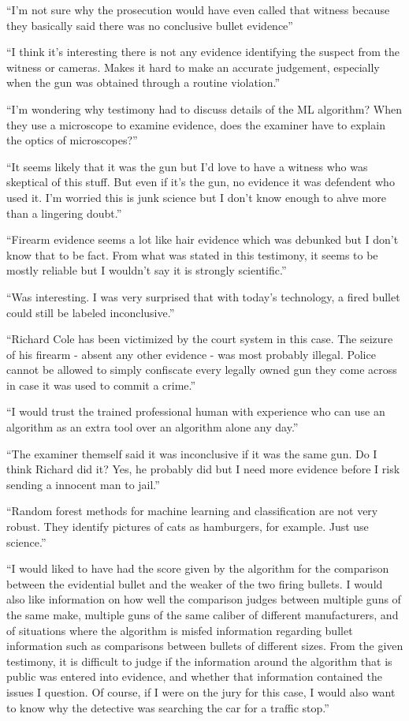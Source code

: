 \documentclass[print]{nuthesis}
\begin{document}
``I'm not sure why the prosecution would have even called that witness because they basically said there was no conclusive bullet evidence''

``I think it's interesting there is not any evidence identifying the suspect from the witness or cameras. Makes it hard to make an accurate judgement, especially when the gun was obtained through a routine violation.''

``I'm wondering why testimony had to discuss details of the ML algorithm? When they use a microscope to examine evidence, does the examiner have to explain the optics of microscopes?''

``It seems likely that it was the gun but I'd love to have a witness who was skeptical of this stuff. But even if it's the gun, no evidence it was defendent who used it. I'm worried this is junk science but I don't know enough to ahve more than a lingering doubt.''

``Firearm evidence seems a lot like hair evidence which was debunked but I don't know that to be fact. From what was stated in this testimony, it seems to be mostly reliable but I wouldn't say it is strongly scientific.''

``Was interesting. I was very surprised that with today's technology, a fired bullet could still be labeled inconclusive.''

``Richard Cole has been victimized by the court system in this case. The seizure of his firearm - absent any other evidence - was most probably illegal. Police cannot be allowed to simply confiscate every legally owned gun they come across in case it was used to commit a crime.''

``I would trust the trained professional human with experience who can use an algorithm as an extra tool over an algorithm alone any day.''

``The examiner themself said it was inconclusive if it was the same gun. Do I think Richard did it? Yes, he probably did but I need more evidence before I risk sending a innocent man to jail.''

``Random forest methods for machine learning and classification are not very robust. They identify pictures of cats as hamburgers, for example. Just use science.''

``I would liked to have had the score given by the algorithm for the comparison between the evidential bullet and the weaker of the two firing bullets. I would also like information on how well the comparison judges between multiple guns of the same make, multiple guns of the same caliber of different manufacturers, and of situations where the algorithm is misfed information regarding bullet information such as comparisons between bullets of different sizes. From the given testimony, it is difficult to judge if the information around the algorithm that is public was entered into evidence, and whether that information contained the issues I question. Of course, if I were on the jury for this case, I would also want to know why the detective was searching the car for a traffic stop.''
\end{document}
